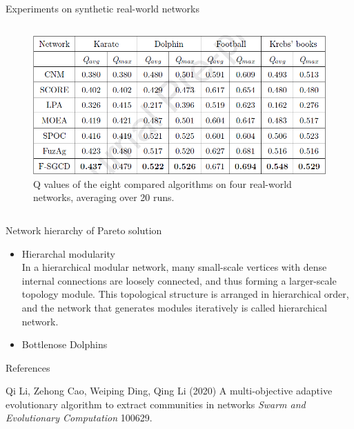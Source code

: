 \documentclass[aspectratio=169,xcolor=dvipsnames]{beamer}
\begin{document}

\begin{frame}{Experiments on synthetic real-world networks}
    \begin{columns}
        \begin{column}{0.5\textwidth}
            \begin{figure}
            \centering
                \includegraphics[width=1\textwidth]{synthetic-realworld.PNG}
                \caption{Q values of the eight compared algorithms on four real-world networks, averaging
                over 20 runs.}
            \end{figure}
        \end{column}
    \end{columns}
\end{frame}


\begin{frame}{Network hierarchy of Pareto solution}
    \begin{itemize}
        \item Hierarchal modularity \\
        In a hierarchical modular network, many small-scale vertices with dense internal connections are loosely connected, and thus forming a larger-scale topology module. This topological structure is arranged in hierarchical order, and the network that generates modules iteratively is called hierarchical network.
        \item Bottlenose Dolphins
    \end{itemize}
\end{frame}


\begin{frame}{References}
    \footnotesize{
        \begin{thebibliography}{99}
             Qi Li, Zehong Cao, Weiping Ding, Qing Li (2020)
            \newblock A multi-objective adaptive evolutionary algorithm to extract communities in networks
            \newblock \emph{Swarm and Evolutionary Computation} 100629.
        \end{thebibliography}
    }
\end{frame}
\end{document}
